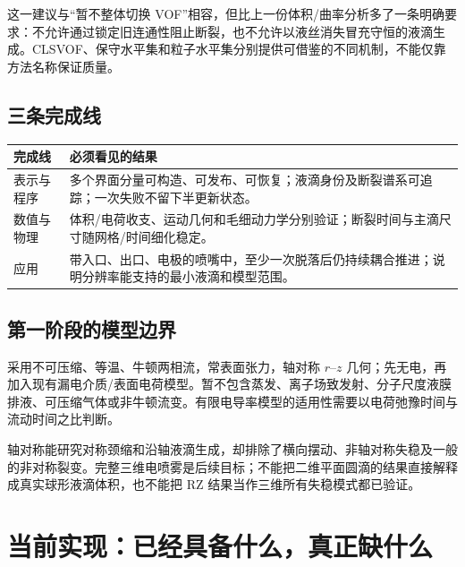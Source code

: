 \documentclass[11pt,a4paper]{article}
\begin{document}
这一建议与“暂不整体切换 VOF”相容，但比上一份体积/曲率分析多了一条明确要求：不允许通过锁定旧连通性阻止断裂，也不允许以液丝消失冒充守恒的液滴生成。CLSVOF、保守水平集和粒子水平集分别提供可借鉴的不同机制\cite{sussman2000,olsson2005,desjardins2008,enright2002}，不能仅靠方法名称保证质量。

\subsection{三条完成线}
\noindent
\begin{tabularx}{\linewidth}{L{28mm}Y}
\toprule
完成线 & 必须看见的结果\\\midrule
表示与程序 & 多个界面分量可构造、可发布、可恢复；液滴身份及断裂谱系可追踪；一次失败不留下半更新状态。\\
数值与物理 & 体积/电荷收支、运动几何和毛细动力学分别验证；断裂时间与主滴尺寸随网格/时间细化稳定。\\
应用 & 带入口、出口、电极的喷嘴中，至少一次脱落后仍持续耦合推进；说明分辨率能支持的最小液滴和模型范围。\\\bottomrule
\end{tabularx}

\subsection{第一阶段的模型边界}
采用不可压缩、等温、牛顿两相流，常表面张力，轴对称 $r$--$z$ 几何；先无电，再加入现有漏电介质/表面电荷模型。暂不包含蒸发、离子场致发射、分子尺度液膜排液、可压缩气体或非牛顿流变。有限电导率模型的适用性需要以电荷弛豫时间与流动时间之比判断。

轴对称能研究对称颈缩和沿轴液滴生成，却排除了横向摆动、非轴对称失稳及一般的非对称裂变。完整三维电喷雾是后续目标；不能把二维平面圆滴的结果直接解释成真实球形液滴体积，也不能把 RZ 结果当作三维所有失稳模式都已验证。

\section{当前实现：已经具备什么，真正缺什么}
\end{document}
